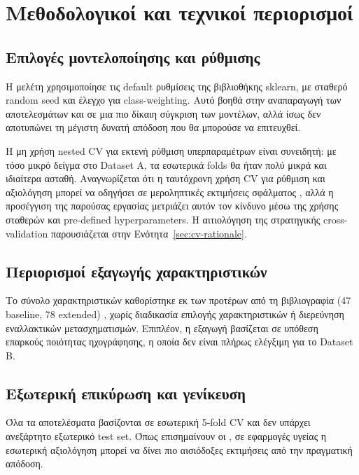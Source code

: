 \section{Μεθοδολογικοί και τεχνικοί περιορισμοί}

\subsection{Επιλογές μοντελοποίησης και ρύθμισης}

Η μελέτη χρησιμοποίησε τις default ρυθμίσεις της βιβλιοθήκης sklearn, 
με σταθερό random seed και έλεγχο για class-weighting. 
Αυτό βοηθά στην αναπαραγωγή των αποτελεσμάτων και σε μια πιο δίκαιη σύγκριση των μοντέλων, 
αλλά ίσως δεν αποτυπώνει τη μέγιστη δυνατή απόδοση που θα μπορούσε να επιτευχθεί.

Η μη χρήση nested CV για εκτενή ρύθμιση υπερπαραμέτρων είναι συνειδητή: 
με τόσο μικρό δείγμα στο Dataset A, τα εσωτερικά folds θα ήταν πολύ μικρά και ιδιαίτερα ασταθή. 
Αναγνωρίζεται ότι η ταυτόχρονη χρήση CV για ρύθμιση και αξιολόγηση μπορεί να οδηγήσει σε μεροληπτικές εκτιμήσεις σφάλματος \citep{varma2006nestedcv, cawley2010overfitting}, 
αλλά η προσέγγιση της παρούσας εργασίας μετριάζει αυτόν τον κίνδυνο μέσω της χρήσης σταθερών και pre-defined hyperparameters.
Η αιτιολόγηση της στρατηγικής cross-validation παρουσιάζεται στην Ενότητα~\ref{sec:cv-rationale}.

\subsection{Περιορισμοί εξαγωγής χαρακτηριστικών}

Το σύνολο χαρακτηριστικών καθορίστηκε εκ των προτέρων από τη βιβλιογραφία (47 baseline, 78 extended) \citep{saenz2014methodological}, 
χωρίς διαδικασία επιλογής χαρακτηριστικών ή διερεύνηση εναλλακτικών μετασχηματισμών. 
Επιπλέον, η εξαγωγή βασίζεται σε υπόθεση επαρκούς ποιότητας ηχογράφησης, η οποία δεν είναι πλήρως ελέγξιμη για το Dataset B.

\subsection{Εξωτερική επικύρωση και γενίκευση}

Όλα τα αποτελέσματα βασίζονται σε εσωτερική 5-fold CV και δεν υπάρχει ανεξάρτητο εξωτερικό test set. 
Όπως επισημαίνουν οι \citet{ge2023inflation}, σε εφαρμογές υγείας η εσωτερική αξιολόγηση μπορεί να δίνει πιο αισιόδοξες εκτιμήσεις από την πραγματική απόδοση. 

